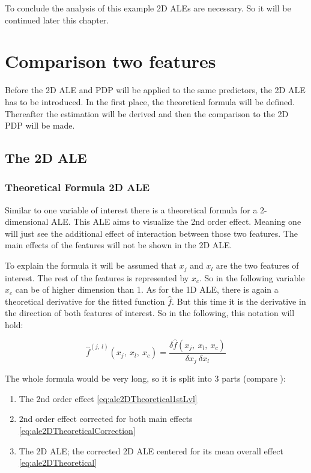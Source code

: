 \documentclass[]{krantz}
\begin{document}
To conclude the analysis of this example 2D ALEs are necessary. So it
will be continued later this chapter.

\section{Comparison two features}\label{comparison-two-features}

Before the 2D ALE and PDP will be applied to the same predictors, the 2D
ALE has to be introduced. In the first place, the theoretical formula
will be defined. Thereafter the estimation will be derived and then the
comparison to the 2D PDP will be made.

\subsection{The 2D ALE}\label{the-2d-ale}

\subsubsection{Theoretical Formula 2D
ALE}\label{theoretical-formula-2d-ale}

Similar to one variable of interest there is a theoretical formula for a
2-dimensional ALE. This ALE aims to visualize the 2nd order effect.
Meaning one will just see the additional effect of interaction between
those two features. The main effects of the features will not be shown
in the 2D ALE.

To explain the formula it will be assumed that \(x_j\) and \(x_l\) are
the two features of interest. The rest of the features is represented by
\(x_c\). So in the following variable \(x_c\) can be of higher dimension
than 1. As for the 1D ALE, there is again a theoretical derivative for
the fitted function \(\hat{f}\). But this time it is the derivative in
the direction of both features of interest. So in the following, this
notation will hold:

\[ \hat{f}^{(j,~l)}(x_j,~x_l,~x_c) = \frac{\delta\hat{f}(x_j,~x_l,~x_c)}{\delta x_j~ \delta x_l}\]

The whole formula would be very long, so it is split into 3 parts
(compare \citep[page 8]{Apley2016}):

\begin{enumerate}
\def\labelenumi{\arabic{enumi}.}
\item
  The 2nd order effect \eqref{eq:ale2DTheoretical1stLvl}
\item
  2nd order effect corrected for both main effects
  \eqref{eq:ale2DTheoreticalCorrection}
\item
  The 2D ALE; the corrected 2D ALE centered for its mean overall effect
  \eqref{eq:ale2DTheoretical}
\end{enumerate}
\end{document}
